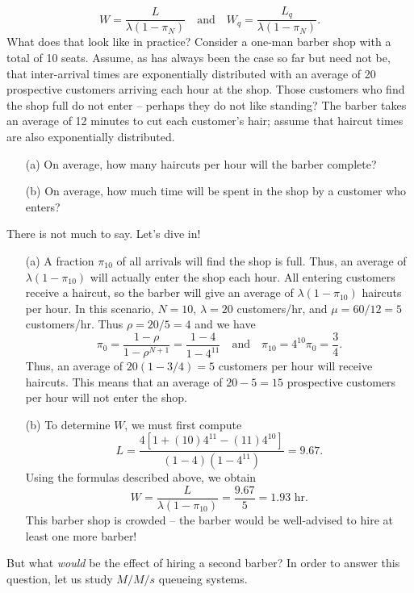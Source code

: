 $$ W = \frac{L}{\lambda\left(1-\pi_{N}\right)}\quad \text{and}\quad W_{q} = \frac{L_{q}}{\lambda\left(1-\pi_{N}\right)}.$$
What does that look like in practice? Consider a one-man barber shop with a total of 10 seats. Assume, as has always been the case so far but need not be, that inter-arrival times are exponentially distributed with an average of 20 prospective customers arriving each hour at the shop. Those customers who find the shop full do not enter -- perhaps they do not like standing? The barber takes an average of 12 minutes to cut each customer's hair; assume that haircut times are also exponentially distributed.
\begin{itemize}[noitemsep]
	\item[(a)] On average, how many haircuts per hour will the barber complete?
	\item[(b)] On average, how much time will be spent in the shop by a customer who enters?
\end{itemize}
There is not much to say. Let's dive in!
\begin{itemize}[noitemsep]
	\item[(a)] A fraction $\pi_{10}$ of all arrivals will find the shop is full. Thus, an average of $\lambda\left(1-\pi_{10}\right)$ will actually enter the shop each hour.  All entering customers receive a haircut, so the barber will give an average of $\lambda\left(1-\pi_{10}\right)$ haircuts per hour. In this scenario, $N=10$, $\lambda=20$ customers/hr, and $\mu=60/12 = 5 $ customers/hr. Thus $\rho= 20/5 = 4$ and  we have 
	$$ \pi_{0} = \frac{1-\rho}{1-\rho^{N+1}} = \frac{1-4}{1-4^{11}} \quad\text{and}\quad \pi_{10} = 4^{10} \pi_{0} = \frac{3}{4}.$$
Thus, an average of $20(1 - 3/4)= 5$ customers per hour will receive haircuts. This means that an average of $20 - 5 = 15$ prospective customers per hour will not enter the shop.	
\item[(b)] To determine $W$, we must first compute 
$$L = \frac{4 [1+ (10) 4^{11} - (11) 4^{10} ]}{(1-4)\left(1-4^{11}\right)} = 9.67.$$ 
Using the formulas described above, we obtain 
$$ W = \frac{L}{\lambda\left(1-\pi_{10}\right)} = \frac{9.67}{5} = 1.93 \text{ hr}.$$
This barber shop is crowded -- the barber would be well-advised to hire at least one more barber!
\end{itemize}
But what \textit{would} be the effect of hiring a second barber? In order to answer this question, let us study $M/M/s$ queueing systems.   
